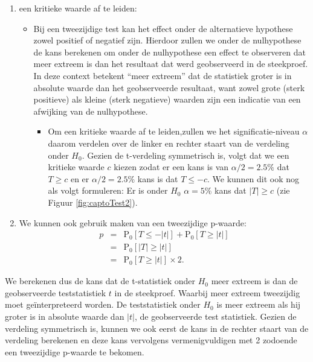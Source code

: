 \documentclass[
  12pt,dutch,coursenotes]{book}
\providecommand{\tightlist}{%
  \setlength{\itemsep}{0pt}\setlength{\parskip}{0pt}}
\theoremstyle{definition}
\theoremstyle{definition}
\theoremstyle{definition}
\theoremstyle{remark}
\begin{document}
\begin{enumerate}
\def\labelenumi{\arabic{enumi}.}
\tightlist
\item
  een kritieke waarde af te leiden:

  \begin{itemize}
  \tightlist
  \item
    Bij een tweezijdige test kan het effect onder de alternatieve hypothese zowel positief of negatief zijn. Hierdoor zullen we onder de nulhypothese de kans berekenen om onder de nulhypothese een effect te observeren dat meer extreem is dan het resultaat dat werd geobserveerd in de steekproef. In deze context betekent ``meer extreem'' dat de statistiek groter is in absolute waarde dan het geobserveerde resultaat, want zowel grote (sterk positieve) als kleine (sterk negatieve) waarden zijn een indicatie van een afwijking van de nulhypothese.

    \begin{itemize}
    \tightlist
    \item
      Om een kritieke waarde af te leiden,zullen we het significatie-niveau \(\alpha\) daarom verdelen over de linker en rechter staart van de verdeling onder \(H_0\). Gezien de t-verdeling symmetrisch is, volgt dat we een kritieke waarde \(c\) kiezen zodat er een kans is van \(\alpha/2=2.5\%\) dat \(T\geq c\) en er \(\alpha/2=2.5\%\) kans is dat \(T\leq -c\). We kunnen dit ook nog als volgt formuleren: Er is onder \(H_0\) \(\alpha=5\%\) kans dat \(\vert T\vert\geq c\) (zie Figuur \ref{fig:captoTest2}).
    \end{itemize}
  \end{itemize}
\item
  We kunnen ook gebruik maken van een tweezijdige p-waarde:
  \begin{eqnarray*}
    p&=&\text{P}_0\left[T\leq -|t|\right] + \text{P}_0\left[T\geq |t|\right]\\
    &=&\text{P}_0\left[\vert T\vert \geq \vert t \vert\right]\\
    &=&\text{P}_0\left[T \geq \vert t \vert\right]\times 2.
    \end{eqnarray*}
\end{enumerate}

We berekenen dus de kans dat de t-statistiek onder \(H_0\) meer extreem is dan de geobserveerde teststatistiek \(t\) in de steekproef.
Waarbij meer extreem tweezijdig moet geïnterpreteerd worden.
De teststatistiek onder \(H_0\) is meer extreem als hij groter is in absolute waarde dan \(\vert t \vert\), de geobserveerde test statistiek.
Gezien de verdeling symmetrisch is, kunnen we ook eerst de kans in de rechter staart van de verdeling berekenen en deze kans vervolgens vermenigvuldigen met 2 zodoende een tweezijdige p-waarde te bekomen.
\end{document}
